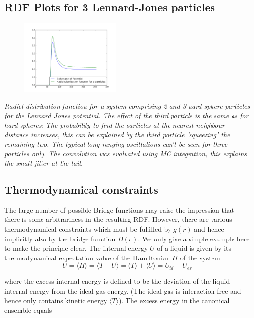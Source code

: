 \documentclass[11pt,a4paper]{article}
\begin{document}
\subsection{RDF Plots for 3 Lennard-Jones particles }
\begin{figure}[htb]
\centering
\includegraphics[width=5cm]{rdfLJ3P.png}
\end{figure}
\textit{Radial distribution function for a system comprising 2 and 3 hard sphere particles for the Lennard Jones potential.
The effect of the third particle is the same as for hard spheres: The probability to find the particles at the nearest
neighbour distance increases, this can be explained by the third particle 'squeezing' the remaining two. The typical long-ranging
oscillations can't be seen for three particles only. \newline The convolution was evaluated using MC integration, this explains
the small jitter at the tail.}


\subsection{Thermodynamical constraints }
The large number of possible Bridge functions may raise the impression that there is some arbitrariness in
the resulting RDF. However, there are various thermodynamical constraints which must be fulfilled by 
$g(r)$ and hence implicitly also by the bridge function $B(r)$. We only give a simple example here to make
the principle clear. \newline
The internal energy $U$ of a liquid is given by its thermodynamical expectation value of the Hamiltonian $H$
of the system
\begin{equation}
U = \langle H \rangle = \langle T + U  \rangle
=
\langle T \rangle + \langle U  \rangle =
U_{id} + U_{ex} 
\end{equation}

where the excess internal energy is defined to be the deviation of the liquid internal energy from the ideal gas energy. 
(The ideal gas is interaction-free and hence only contains kinetic energy $\langle T \rangle$). The excess energy
in the canonical ensemble equals
\end{document}
